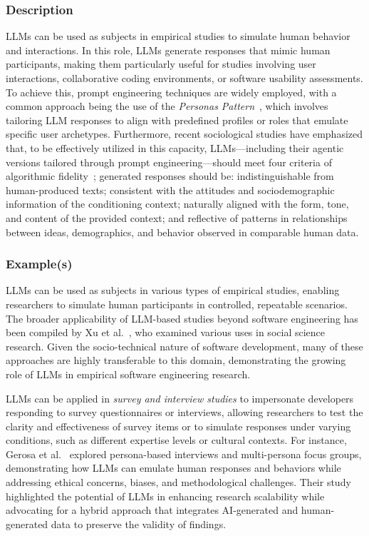 \subsubsection{Description}

LLMs can be used as subjects in empirical studies to simulate human behavior and interactions. In this role, LLMs generate responses that mimic human participants, making them particularly useful for studies involving user interactions, collaborative coding environments, or software usability assessments. 
To achieve this, prompt engineering techniques are widely employed, with a common approach being the use of the \textit{Personas Pattern}~\cite{DBLP:journals/corr/abs-2308-07702}, which involves tailoring LLM responses to align with predefined profiles or roles that emulate specific user archetypes. 
Furthermore, recent sociological studies have emphasized that, to be effectively utilized in this capacity, LLMs—including their agentic versions tailored through prompt engineering—should meet four criteria of algorithmic fidelity~\cite{DBLP:journals/corr/abs-2209-06899}; generated responses should be: indistinguishable from human-produced texts; consistent with the attitudes and sociodemographic information of the conditioning context; naturally aligned with the form, tone, and content of the provided context; and reflective of patterns in relationships between ideas, demographics, and behavior observed in comparable human data.

\subsubsection{Example(s)}

LLMs can be used as subjects in various types of empirical studies, enabling researchers to simulate human participants in controlled, repeatable scenarios. The broader applicability of LLM-based studies beyond software engineering has been compiled by Xu et al.~\cite{DBLP:journals/ipm/XuSRGPLSH24}, who examined various uses in social science research. Given the socio-technical nature of software development, many of these approaches are highly transferable to this domain, demonstrating the growing role of LLMs in empirical software engineering research.

LLMs can be applied in \textit{survey and interview studies} to impersonate developers responding to survey questionnaires or interviews, allowing researchers to test the clarity and effectiveness of survey items or to simulate responses under varying conditions, such as different expertise levels or cultural contexts. For instance, Gerosa et al.~\cite{DBLP:journals/ase/GerosaTSS24} explored persona-based interviews and multi-persona focus groups, demonstrating how LLMs can emulate human responses and behaviors while addressing ethical concerns, biases, and methodological challenges. Their study highlighted the potential of LLMs in enhancing research scalability while advocating for a hybrid approach that integrates AI-generated and human-generated data to preserve the validity of findings.

